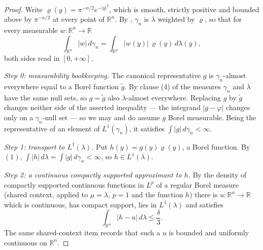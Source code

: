 \begin{proof}
Write $\varrho(y) = \pi^{-n/2}e^{-|y|^2}$, which is smooth, strictly positive and
bounded above by $\pi^{-n/2}$ at every point of $\mathbb{R}^n$.  By
, $\gamma_n$ is $\lambda$ weighted by $\varrho$, so that
for every measurable $w : \mathbb{R}^n \to \mathbb{R}$
\begin{equation*}
  \int_{\mathbb{R}^n}|w|\,d\gamma_n
    = \int_{\mathbb{R}^n}|w(y)|\,\varrho(y)\,d\lambda(y) , \tag{1}
\end{equation*}
both sides read in $[0,+\infty]$.

\emph{Step 0: measurability bookkeeping.}
The canonical representative $g$ is $\gamma_n$-almost everywhere equal to a Borel
function $\widetilde g$.  By clause (4) of 
the measures $\gamma_n$ and $\lambda$ have the same null sets, so
$g = \widetilde g$ also $\lambda$-almost everywhere.  Replacing $g$ by
$\widetilde g$ changes neither side of the asserted inequality --- the
integrand $|g - \varphi|$ changes only on a $\gamma_n$-null set --- so we may and
do assume $g$ Borel measurable.  Being the representative of an element of
$L^1(\gamma_n)$, it satisfies $\int|g|\,d\gamma_n < \infty$.

\emph{Step 1: transport to $L^1(\lambda)$.}
Put $h(y) = g(y)\varrho(y)$, a Borel function.  By $(1)$,
$\int|h|\,d\lambda = \int|g|\,d\gamma_n < \infty$, so $h \in L^1(\lambda)$.

\emph{Step 2: a continuous compactly supported approximant to $h$.}
By the density of compactly supported continuous functions in $L^p$ of a regular
Borel measure (shared context, applied to $\mu = \lambda$, $p = 1$ and the
function $h$) there is $u : \mathbb{R}^n \to \mathbb{R}$ which is continuous,
has compact support, lies in $L^1(\lambda)$ and satisfies
\begin{equation*}
  \int_{\mathbb{R}^n}|h - u|\,d\lambda \leq \frac{\delta}{3} . \tag{2}
\end{equation*}
The same shared-context item records that such a $u$ is bounded and uniformly
continuous on $\mathbb{R}^n$.


\end{proof}
